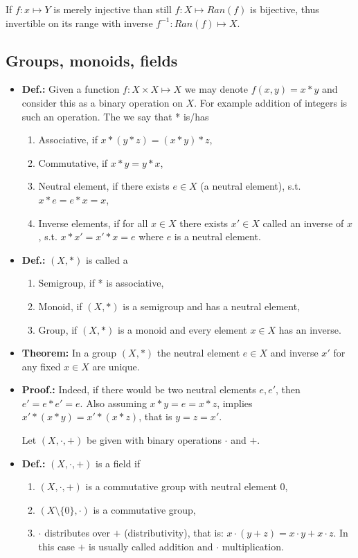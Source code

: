 \documentclass{article}
\begin{document}
If $f: x\mapsto Y$ is merely injective than still $f: X\mapsto Ran(f)$ is bijective, thus invertible on its range with inverse $f^{-1}: Ran(f)\mapsto X$.

\subsection{Groups, monoids, fields}

\begin{itemize}
\item \textbf{Def.:} Given a function $f: X\times X \mapsto X$ we may denote $f(x, y) = x * y$ and consider this as a binary operation on $X$. For example addition of integers is such an operation. The we say that * is/has

\begin{enumerate}
    \item Associative, if $x * (y * z) = (x * y) * z$,
    \item Commutative, if $x * y = y * x$,
    \item Neutral element, if there exists $e\in X$ (a neutral element), s.t. $x*e=e*x=x$,
    \item Inverse elements, if for all $x\in X$ there exists $x'\in X$ called an inverse of $x$, s.t. $x*x'=x'*x =e$ where $e$ is a neutral element.
\end{enumerate}

\item \textbf{Def.:} $(X, *)$ is called a
\begin{enumerate}
    \item Semigroup, if * is associative,
    \item Monoid, if $(X, *)$ is a semigroup and has a neutral element,
    \item Group, if $(X, *)$ is a monoid and every element $x\in X$ has an inverse.
\end{enumerate}

\item \textbf{Theorem:} In a group $(X, *)$ the neutral element $e\in X$ and inverse $x'$ for any fixed $x\in X$ are unique.

\item \textbf{Proof.:} Indeed, if there would be two neutral elements $e, e'$, then $e'=e*e'=e$. Also assuming $x*y=e=x*z$, implies $x'*(x*y)=x'*(x*z)$, that is $y=z=x'$.

Let $(X, \cdot, +)$ be given with binary operations $\cdot$ and $+$.

\item \textbf{Def.:} $(X, \cdot, +)$ is a field if
\begin{enumerate}
    \item $(X, \cdot, +)$ is a commutative group with neutral element 0,
    \item $(X\setminus \{0\}, \cdot)$ is a commutative group,
    \item $\cdot$ distributes over $+$ (distributivity), that is: $x\cdot (y+z) = x\cdot y + x\cdot z$.
In this case $+$ is usually called addition and $\cdot$ multiplication.
\end{enumerate}


\end{itemize}
\end{document}
